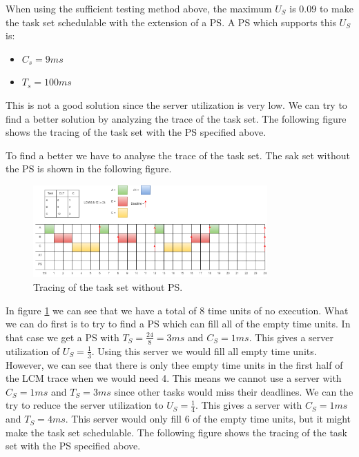         When using the sufficient testing method above, the maximum $U_S$ is $0.09$ to make the task set schedulable with the extension of a PS. A PS which supports this $U_S$ is:
        \begin{itemize}
            \item $C_s = 9ms$
            \item $T_s = 100ms$
        \end{itemize}

        This is not a good solution since the server utilization is very low. We can try to find a better solution by analyzing the trace of the task set. The following figure shows the tracing of the task set with the PS specified above.

        To find a better we have to analyse the trace of the task set. The sak set without the PS is shown in the following figure.

        \begin{figure}[H]
            \centering
            \includegraphics[width=0.8\textwidth]{images/Ass1Q8a.png}
            \caption{Tracing of the task set without PS.}
            \label{fig:Q8Atrace}
        \end{figure}

        In figure \ref{fig:Q8Atrace} we can see that we have a total of 8 time units of no execution. What we can do first is to try to find a PS which can fill all of the empty time units. In that case we get a PS with $T_S = \frac{24}{8} = 3ms$ and $C_S = 1ms$. This gives a server utilization of $U_S = \frac{1}{3}$. Using this server we would fill all empty time units. However, we can see that there is only thee empty time units in the first half of the LCM trace when we would need 4. This means we cannot use a server with $C_S = 1ms$ and $T_S = 3ms$ since other tasks would miss their deadlines. We can the try to reduce the server utilization to $U_S = \frac{1}{4}$. This gives a server with $C_S = 1ms$ and $T_S = 4ms$. This server would only fill 6 of the empty time units, but it might make the task set schedulable. The following figure shows the tracing of the task set with the PS specified above.

